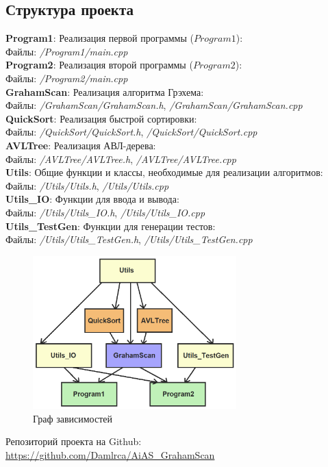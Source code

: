 \subsection{Структура проекта}
\noindent \textbf{Program1}: Реализация первой программы ($Program1$):\\
Файлы: \textsl{/Program1/main.cpp}\\
\noindent \textbf{Program2}: Реализация второй программы ($Program2$):\\
Файлы: \textsl{/Program2/main.cpp}\\
\noindent \textbf{GrahamScan}: Реализация алгоритма Грэхема:\\
Файлы: \textsl{/GrahamScan/GrahamScan.h}, \textsl{/GrahamScan/GrahamScan.cpp}\\
\noindent \textbf{QuickSort}: Реализация быстрой сортировки:\\
Файлы: \textsl{/QuickSort/QuickSort.h}, \textsl{/QuickSort/QuickSort.cpp}\\
\noindent \textbf{AVLTree}: Реализация АВЛ-дерева:\\
Файлы: \textsl{/AVLTree/AVLTree.h}, \textsl{/AVLTree/AVLTree.cpp}\\
\noindent \textbf{Utils}: Общие функции и классы, необходимые для реализации алгоритмов:\\
Файлы: \textsl{/Utils/Utils.h}, \textsl{/Utils/Utils.cpp}\\
\noindent \textbf{Utils\_IO}: Функции для ввода и вывода:\\
Файлы: \textsl{/Utils/Utils\_IO.h}, \textsl{/Utils/Utils\_IO.cpp}\\
\noindent \textbf{Utils\_TestGen}: Функции для генерации тестов:\\
Файлы: \textsl{/Utils/Utils\_TestGen.h}, \textsl{/Utils/Utils\_TestGen.cpp}\\

\begin{figure}[h]
	\centering
	\includegraphics[width=0.7\textwidth]{Images/project_structure.png}
	\caption{Граф зависимостей}
	\label{fig:project_structure}
\end{figure}

\noindent Репозиторий проекта на Github:\\ \url{https://github.com/Damlrca/AiAS_GrahamScan}

\newpage
